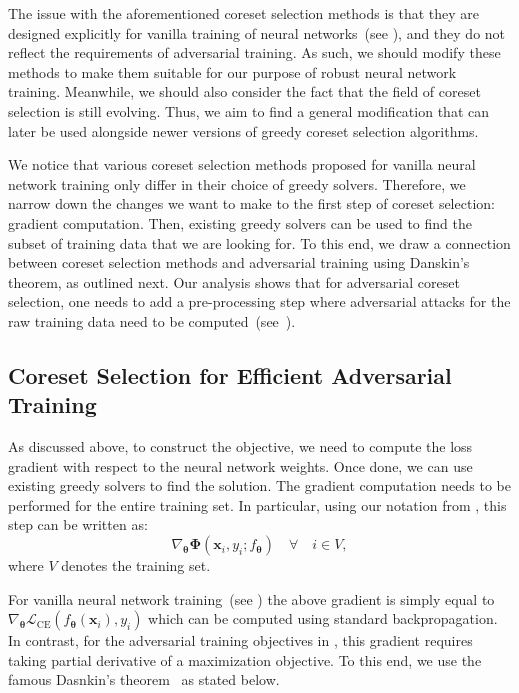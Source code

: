 \documentclass[runningheads]{llncs}
\begin{document}
The issue with the aforementioned coreset selection methods is that they are designed explicitly for vanilla training of neural networks~(see ), and they do not reflect the requirements of adversarial training.
As such, we should modify these methods to make them suitable for our purpose of robust neural network training.
Meanwhile, we should also consider the fact that the field of coreset selection is still evolving.
Thus, we aim to find a general modification that can later be used alongside newer versions of greedy coreset selection algorithms.

We notice that various coreset selection methods proposed for vanilla neural network training only differ in their choice of greedy solvers.
Therefore, we narrow down the changes we want to make to the first step of coreset selection: gradient computation.
Then, existing greedy solvers can be used to find the subset of training data that we are looking for.
To this end, we draw a connection between coreset selection methods and adversarial training using Danskin's theorem, as outlined next.
Our analysis shows that for adversarial coreset selection, one needs to add a pre-processing step where adversarial attacks for the raw training data need to be computed~(see~).

\subsection{Coreset Selection for Efficient Adversarial Training}\label{sec:sec:coreset_adversarial}

As discussed above, to construct the  objective, we need to compute the loss gradient with respect to the neural network weights.
Once done, we can use existing greedy solvers to find the solution.
The gradient computation needs to be performed for the entire training set.
In particular, using our notation from , this step can be written as:
\begin{equation}\label{eq:nn_gradient}
\nabla_{\boldsymbol{\theta}}\boldsymbol{\Phi} \left(\boldsymbol{x}_{i}, y_{i}; f_{\boldsymbol{\theta}}\right) \quad \forall\quad i \in V,	
\end{equation}
where $V$ denotes the training set.

For vanilla neural network training~(see ) the above gradient is simply equal to $\nabla_{\boldsymbol{\theta}}\mathcal{L}_{\mathrm{CE}}\left(f_{\boldsymbol{\theta}}(\boldsymbol{x}_{i}), y_{i}\right)$ which can be computed using standard backpropagation.
In contrast, for the adversarial training objectives in , this gradient requires taking partial derivative of a maximization objective.
To this end, we use the famous Dasnkin's theorem~\cite{danskin1967theory} as stated below.
\end{document}

